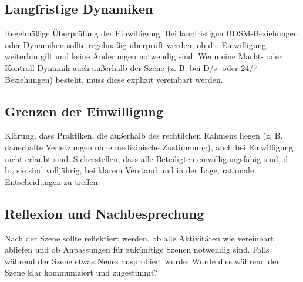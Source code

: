 \documentclass[a4paper,12pt]{article}
\begin{document}
\subsection{Langfristige Dynamiken}
Regelmäßige Überprüfung der Einwilligung: Bei langfristigen BDSM-Beziehungen oder Dynamiken sollte regelmäßig überprüft werden, ob die Einwilligung weiterhin gilt und keine Änderungen notwendig sind. Wenn eine Macht- oder Kontroll-Dynamik auch außerhalb der Szene (z. B. bei D/s- oder 24/7-Beziehungen) besteht, muss diese explizit vereinbart werden.

\subsection{Grenzen der Einwilligung}
Klärung, dass Praktiken, die außerhalb des rechtlichen Rahmens liegen (z. B. dauerhafte Verletzungen ohne medizinische Zustimmung), auch bei Einwilligung nicht erlaubt sind. Sicherstellen, dass alle Beteiligten einwilligungsfähig sind, d. h., sie sind volljährig, bei klarem Verstand und in der Lage, rationale Entscheidungen zu treffen.

\subsection{Reflexion und Nachbesprechung}
Nach der Szene sollte reflektiert werden, ob alle Aktivitäten wie vereinbart abliefen und ob Anpassungen für zukünftige Szenen notwendig sind. Falls während der Szene etwas Neues ausprobiert wurde: Wurde dies während der Szene klar kommuniziert und zugestimmt?
\end{document}
